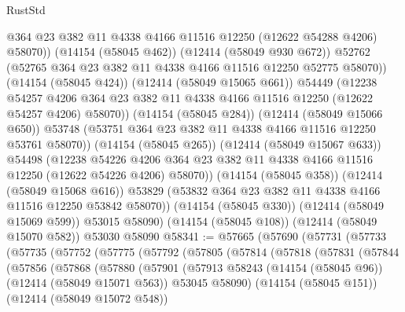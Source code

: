 \begin{lexlean}{RustStd}
\begin{coremodule}
{\begin{coremodule}
{{{{{{{{{{{{{{{{{{{{{{{{{{{{{{{{{{{{{{{{{{{{{{{{{{                    @364
                    @23
                    @382
                    @11
                    @4338
                    @4166
                    @11516
                    @12250
                    (@12622 @54288 @4206)
                    @58070))
                (@14154 (@58045 @462))
                (@12414 (@58049 @930 @672))
                @52762
                (@52765 @364 @23 @382 @11 @4338 @4166 @11516 @12250 @52775 @58070))
              (@14154 (@58045 @424))
              (@12414 (@58049 @15065 @661))
              @54449
              (@12238
                @54257
                @4206
                @364
                @23
                @382
                @11
                @4338
                @4166
                @11516
                @12250
                (@12622 @54257 @4206)
                @58070))
            (@14154 (@58045 @284))
            (@12414 (@58049 @15066 @650))
            @53748
            (@53751 @364 @23 @382 @11 @4338 @4166 @11516 @12250 @53761 @58070))
          (@14154 (@58045 @265))
          (@12414 (@58049 @15067 @633))
          @54498
          (@12238
            @54226
            @4206
            @364
            @23
            @382
            @11
            @4338
            @4166
            @11516
            @12250
            (@12622 @54226 @4206)
            @58070))
        (@14154 (@58045 @358))
        (@12414 (@58049 @15068 @616))
        @53829
        (@53832 @364 @23 @382 @11 @4338 @4166 @11516 @12250 @53842 @58070))
      (@14154 (@58045 @330))
      (@12414 (@58049 @15069 @599))
      @53015
      @58090)
    (@14154 (@58045 @108))
    (@12414 (@58049 @15070 @582))
    @53030
    @58090
@58341 := @57665
    (@57690
      (@57731
        (@57733
          (@57735
            (@57752
              (@57775
                (@57792
                  (@57805
                    (@57814
                      (@57818
                        (@57831
                          (@57844
                            (@57856
                              (@57868
                                (@57880
                                  (@57901
                                    (@57913
                                      @58243
                                      (@14154 (@58045 @96))
                                      (@12414 (@58049 @15071 @563))
                                      @53045
                                      @58090)
                                    (@14154 (@58045 @151))
                                    (@12414 (@58049 @15072 @548))
}}}}}}}}}}}}}}}}}}}}}}}}}}}}}}}}}}}}}}}}}}}}}}}}}}
\end{coremodule}}
\end{coremodule}
\end{lexlean}
